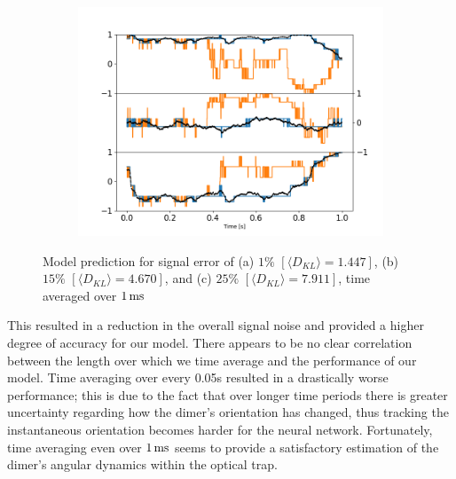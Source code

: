 \begin{figure}[h!]
\begin{subfigure}{0.32\textwidth}
		\includegraphics[width=\textwidth]{fig11c.png}
	\end{subfigure}
	\caption{Model prediction for signal error of (a) $1\%$ 
		$[\langle D_{KL}\rangle=1.447]$, (b) $15\%$ $[\langle D_{KL}\rangle=4.670]$, and (c) $25\%$ $[\langle D_{KL}
		\rangle=7.911]$, time averaged over $1\,{\rm ms}$}
	\label{fig:time average}
\end{figure}
This resulted in a reduction in the overall signal noise and 
provided a higher degree of accuracy for our model. There 
appears to be no clear correlation between the length over 
which we time average and the performance of our model. Time 
averaging over every 0.05s resulted in a drastically worse 
performance; this is due to the fact that over longer time 
periods there is greater uncertainty regarding how the dimer's 
orientation has changed, thus tracking the instantaneous 
orientation becomes harder for the neural network. Fortunately, 
time averaging even over $1\,{\rm ms}$ seems to provide a 
satisfactory estimation of the dimer's angular dynamics within 
the optical trap.

